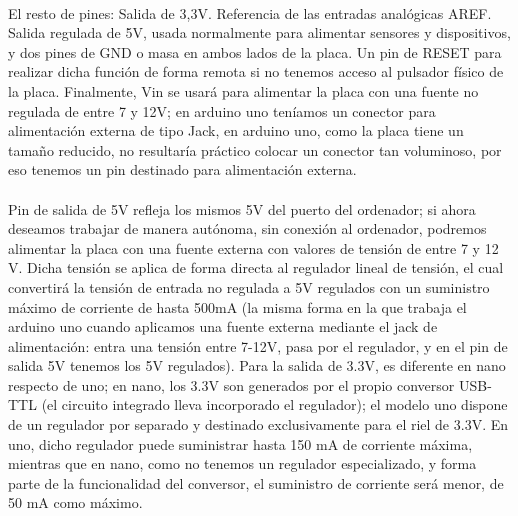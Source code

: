 \documentclass[12pt]{article}
\begin{document}
	 \\
		
	\noindent El resto de pines: Salida de 3,3V. Referencia de las entradas analógicas AREF. Salida regulada de 5V, usada normalmente para alimentar sensores y dispositivos, y dos pines de GND o masa en ambos lados de la placa. Un pin de RESET para realizar dicha función de forma remota si no tenemos acceso al pulsador físico de la placa. Finalmente, Vin se usará para alimentar la placa con una fuente no regulada de entre 7 y 12V; en arduino uno teníamos un conector para alimentación externa de tipo Jack, en arduino uno, como la placa tiene un tamaño reducido, no resultaría práctico colocar un conector tan voluminoso, por eso tenemos un pin destinado para alimentación externa. \\
	
	 \\
	
	\noindent Pin de salida de 5V refleja los mismos 5V del puerto  del ordenador; si ahora deseamos trabajar de manera autónoma, sin conexión al ordenador, podremos alimentar la placa con una fuente externa con valores de tensión de entre 7 y 12 V. Dicha tensión se aplica de forma directa al regulador lineal de tensión, el cual convertirá la tensión de entrada no regulada a 5V regulados con un suministro máximo de corriente de hasta 500mA (la misma forma en la que trabaja el arduino uno cuando aplicamos una fuente externa mediante el jack de alimentación: entra una tensión entre 7-12V, pasa por el regulador, y en el pin de salida 5V tenemos los 5V regulados). Para la salida de 3.3V, es diferente en nano respecto de uno; en nano, los 3.3V son generados por el propio conversor USB-TTL (el circuito integrado lleva incorporado el regulador); el modelo uno dispone de un regulador por separado y destinado exclusivamente para el riel de 3.3V. En uno, dicho regulador puede suministrar hasta 150 mA de corriente máxima, mientras que en nano, como no tenemos un regulador especializado, y forma parte de la funcionalidad del conversor, el suministro de corriente será menor, de 50 mA como máximo. \\
	
	 \\
	
\end{document}
